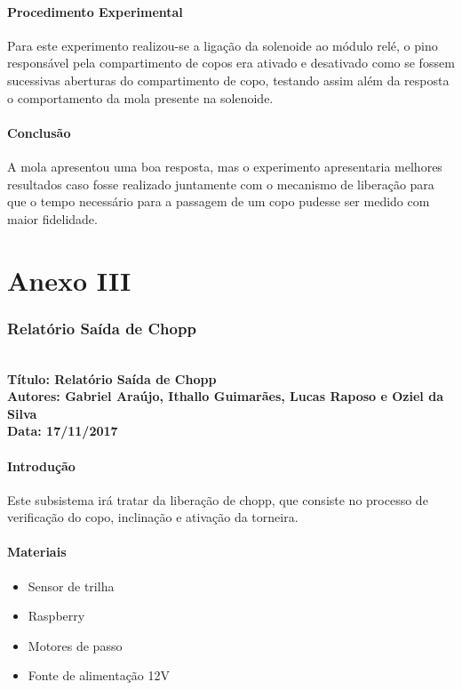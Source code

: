 \begin{anexosenv}
\begin{itemize}
\end{itemize}

\subsubsection{Procedimento Experimental}
    Para este experimento realizou-se a ligação da solenoide ao módulo relé, o pino responsável pela compartimento de copos era ativado e desativado como se fossem sucessivas aberturas do compartimento de copo, testando assim além da resposta o comportamento da mola presente na solenoide.

\subsubsection{Conclusão}
    A mola apresentou uma boa resposta, mas o experimento apresentaria melhores resultados caso fosse realizado juntamente com o mecanismo de liberação para que o tempo necessário para a passagem de um copo pudesse ser medido com maior fidelidade.

\chapter{Anexo III}

\subsection{Relatório Saída de Chopp}    
 \textbf{ \\
  Título: Relatório Saída de Chopp \\
    Autores: Gabriel Araújo, Ithallo Guimarães, Lucas Raposo e Oziel da Silva \\
      Data: 17/11/2017} \\

\subsubsection{Introdução}
    Este subsistema irá tratar da liberação de chopp, que consiste no processo de verificação do copo, inclinação e ativação da torneira.

\subsubsection{Materiais}
\begin{itemize}
     \item Sensor de trilha
     \item Raspberry
     \item Motores de passo
     \item Fonte de alimentação 12V    
         

\end{itemize}
\end{anexosenv}
